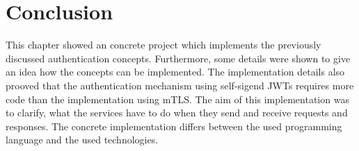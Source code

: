 \section{Conclusion}
This chapter showed an concrete project which implements the previously discussed authentication concepts.
Furthermore, some details were shown to give an idea how the concepts can be implemented.
The implementation details also prooved that the authentication mechanism using self-sigend JWTs requires more code than the implementation using mTLS.
The aim of this implementation was to clarify, what the services have to do when they send and receive requests and responses.
The concrete implementation differs between the used programming language and the used technologies.
